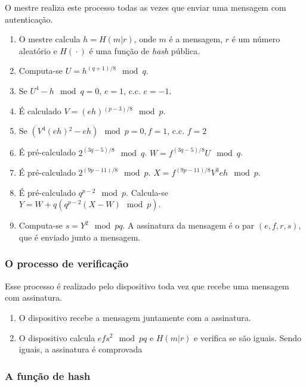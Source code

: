 \documentclass[11pt]{report}
\begin{document}
O mestre realiza este processo todas as vezes que enviar uma mensagem com autenticação.

\begin{enumerate}

\item O mestre calcula $h = H\left({}m|r\right){}$, onde $m$ é a mensagem, $r$ é um número aleatório e $H\left({}\cdot{}\right){}$ é uma função de \textit{hash} pública.

\item Computa-se $U = h^{(q+1)/8} \mod{q}$.
\item Se $U^4 - h \mod{q} = 0$, $e = 1$, c.c. $e = -1$.
\item É calculado $V = \left({}eh\right){}^{(p-3)/8} \mod{p}$.
\item Se $\left({}V^4\left({}eh\right){}^2 - eh\right){} \mod{p} = 0, f = 1$, c.c. $f = 2$
\item É pré-calculado $2^{(3q-5)/8} \mod{q}$. $W = f^{(3q-5)/8}U \mod{q}$.
\item É pré-calculado $2^{(9p-11)/8} \mod{p}.$ $X = f^{(9p-11)/8}V^3eh \mod{p}$.
\item É pré-calculado $q^{p-2} \mod{p}$. Calcula-se $Y = W + q\left({}q^{p-2}\left({}X - W\right){} \mod{p}\right)$.
\item Computa-se $s = Y^2 \mod{pq}$. A assinatura da mensagem é o par $\left({}e,f,r,s\right)$, que é enviado junto a mensagem.

\end{enumerate}

\subsubsection{O processo de verificação}

Esse processo é realizado pelo dispositivo toda vez que recebe uma mensagem com assinatura.

\begin{enumerate}

\item O dispositivo recebe a mensagem juntamente com a assinatura.

\item O dispositivo calcula $efs^2 \mod{pq}$ e $H\left({}m|r\right)$ e verifica se são iguais. Sendo iguais, a assinatura é comprovada

\end{enumerate}

\subsubsection{A função de hash}
\end{document}
